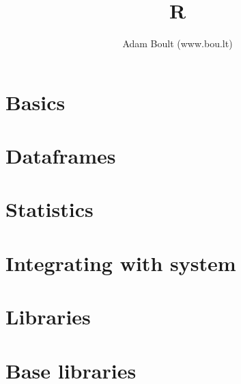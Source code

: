 \documentclass[oneside]{book}
\begin{document}
\author{Adam Boult (www.bou.lt)}
\title{R}
\maketitle

\setcounter{tocdepth}{0}
\tableofcontents



\part{Basics}







\part{Dataframes}


\part{Statistics}

\part{Integrating with system}



\part{Libraries}

\part{Base libraries}
\end{document}
